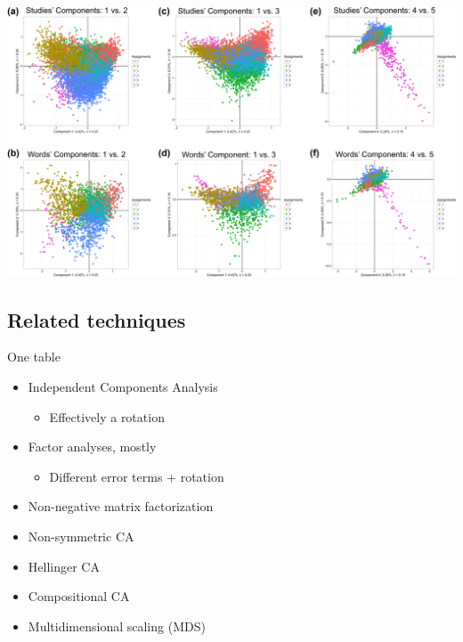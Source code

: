\documentclass[
  ignorenonframetext,
]{beamer}
\providecommand{\tightlist}{%
  \setlength{\itemsep}{0pt}\setlength{\parskip}{0pt}}
\begin{document}
\begin{frame}

\includegraphics{../Images/FA_HBM.jpg}

\end{frame}

\hypertarget{related-techniques}{%
\subsection{Related techniques}\label{related-techniques}}

\begin{frame}{One table}
\protect\hypertarget{one-table}{}

\begin{itemize}[<+->]
\tightlist
\item
  Independent Components Analysis

  \begin{itemize}[<+->]
  \tightlist
  \item
    Effectively a rotation
  \end{itemize}
\item
  Factor analyses, mostly

  \begin{itemize}[<+->]
  \tightlist
  \item
    Different error terms + rotation
  \end{itemize}
\item
  Non-negative matrix factorization
\item
  Non-symmetric CA
\item
  Hellinger CA
\item
  Compositional CA
\item
  Multidimensional scaling (MDS)
\end{itemize}

\end{frame}
\end{document}
